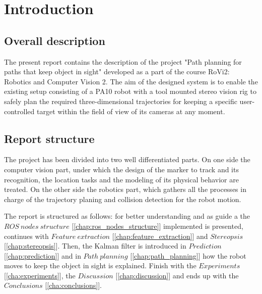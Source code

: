 
\chapter{Introduction}
\label{chap:introduction}

\section{Overall description}
\label{sec:overall_description}
The present report contains the description of the  project "Path planning for paths that keep
object in sight" developed as a part of the course RoVi2: Robotics and Computer Vision 2. 
The aim of the designed system is to enable the existing setup consisting of a PA10 robot with a tool mounted stereo vision rig to safely plan the required three-dimensional trajectories for keeping a specific user-controlled target within the field of view of its cameras at any moment. 

\section{Report structure}
\label{sec:report_structure}
The project has been divided into two well differentiated parts. On one side the computer vision part, under which the design of the marker to track and its recognition, the location tasks and the modeling of its physical behavior are treated.
On the other side the robotics part, which gathers all the processes in charge of the trajectory planing and collision detection for the robot motion.

The report is structured as follows: for better understanding and as guide a the $ROS\ nodes\ structure$ [\ref{chap:ros_nodes_structure}] implemented is presented, continues with $Feature\ extraction$ [\ref{chap:feature_extraction}] and $Stereopsis$ [\ref{chap:stereopsis}]. Then, the Kalman filter is introduced in $Prediction$ [\ref{chap:prediction}] and in $Path\ planning$ [\ref{chap:path_planning}] how the robot moves to keep the object in sight is explained. Finish with the $Experiments$ [\ref{cha:experiments}], the $Discussion$ [\ref{chap:discussion}] and ends up with the $Conclusions$ [\ref{cha:conclusions}]. 